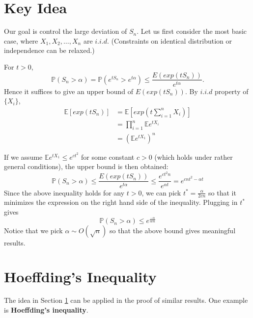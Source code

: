 \documentclass[11pt]{article}
\theoremstyle{definition}
\newcommand\PP{\mathbb{P}}
\newcommand\EE{\mathbb{E}}
\begin{document}
\section{Key Idea}\label{key}
Our goal is control the large deviation of $S_n$. Let us first consider the most basic case, where $X_1,X_2,\dots,X_n$ are $i.i.d$. (Constraints on identical distribution or independence can be relaxed.)

For $t>0$,
$$\PP(S_n>\alpha)=\PP(e^{tS_n}>e^{t\alpha})\leq \frac{E(exp(tS_n))}{e^{t\alpha}}.$$
Hence it suffices to give an upper bound of $E(exp(tS_n))$. By $i.i.d$ property of $\{X_i\}$,
\begin{align*}
\EE[exp(tS_n)]
&=\EE[exp(t\sum_{i=1}^n X_i)]\\
&=\prod_{i=1}^n \EE e^{tX_i}\\
&=( \EE e^{tX_1})^n
\end{align*}

If we assume $\EE e^{tX_1}\leq e^{ct^2}$ for some constant $c>0$ (which holds under rather general conditions),  the upper bound is then obtained:
$$\PP(S_n>\alpha)\leq  \frac{E(exp(tS_n))}{e^{t\alpha}} \leq \frac{e^{ct^2n}}{e^{\alpha t}}=e^{cnt^2-\alpha t}$$
Since the above inequality holds for any $t>0$, we can pick  $t^*=\frac{\alpha}{2cn}$ so that it minimizes the expression on the right hand side of the inequality. Plugging in $t^*$ gives
$$\displaystyle\PP(S_n>\alpha)\leq e^{\frac{-\alpha}{4cn}}$$
Notice that we pick $\alpha\sim O(\sqrt{n})$ so that the above bound gives meaningful results.

\section{Hoeffding's Inequality}
The idea in Section \ref{key} can be applied in the proof of similar results. One example is \textbf{Hoeffding's inequality}.
 
\end{document}
